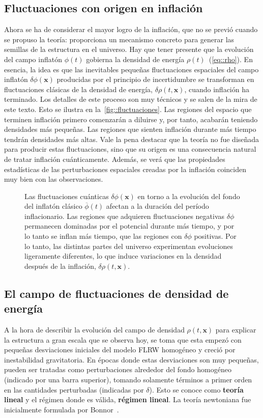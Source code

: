\subsection{Fluctuaciones con origen en inflación}
Ahora se ha de considerar el mayor logro de la inflación, que no se previó cuando se propuso la teoría: proporciona un mecanismo concreto para generar las semillas de la estructura en el universo. Hay que tener presente que la evolución del campo inflatón \(\phi(t)\) gobierna la densidad de energía \(\rho(t)\)~(\eqref{eq::rho}). En esencia, la idea es que las inevitables pequeñas fluctuaciones espaciales del campo inflatón \(\delta\phi(\symbf{x})\) producidas por el principio de incertidumbre se transforman en fluctuaciones clásicas de la densidad de energía, \(\delta\rho(t,\symbf{x})\), cuando inflación ha terminado. Los detalles de este proceso son muy técnicos y se salen de la mira de este texto. Esto se ilustra en la~\autoref{fig::fluctuaciones}. Las regiones del espacio que terminen inflación primero comenzarán a diluirse y, por tanto, acabarán teniendo densidades más pequeñas. Las regiones que sienten inflación durante más tiempo tendrán densidades más altas. Vale la pena destacar que la teoría no fue diseñada para producir estas fluctuaciones, sino que su origen es una consecuencia natural de tratar inflación cuánticamente. Además, se verá que las propiedades estadísticas de las perturbaciones espaciales creadas por la inflación coinciden muy bien con las observaciones.
\begin{figure}
    \centering
    \def\svgwidth{0.75\textwidth}
    
    \caption[Fluctuaciones cuánticas a clásicas]{Las fluctuaciones cuánticas \(\delta\phi(\symbf{x})\) en torno a la evolución del fondo del inflatón clásico \(\overbar{\phi}(t)\) afectan a la duración del período inflacionario. Las regiones que adquieren fluctuaciones negativas \(\delta\phi\) permanecen dominadas por el potencial durante más tiempo, y por lo tanto se inflan más tiempo, que las regiones con \(\delta\phi\) positivas. Por lo tanto, las distintas partes del universo experimentan evoluciones ligeramente diferentes, lo que induce variaciones en la densidad después de la inflación, \(\delta\rho(t,\symbf{x})\).}
    \label{fig::fluctuaciones}
\end{figure}
\subsection{El campo de fluctuaciones de densidad de energía}
A la hora de describir la evolución del campo de densidad \(\rho(t,\symbf{x})\) para explicar la estructura a gran escala que se observa hoy, se toma que esta empezó con pequeñas desviaciones iniciales del modelo FLRW homogéneo y creció por inestabilidad gravitatoria. En épocas donde estas desviaciones son muy pequeñas, pueden ser tratadas como perturbaciones alrededor del fondo homogéneo (indicado por una barra superior), tomando solamente términos a primer orden en las cantidades perturbadas (indicadas por \(\delta\)). Esto se conoce como \textbf{teoría lineal} y el régimen donde es válida, \textbf{régimen lineal}. La teoría newtoniana fue inicialmente formulada por Bonnor~\cite{bonnor1957jeans}.

